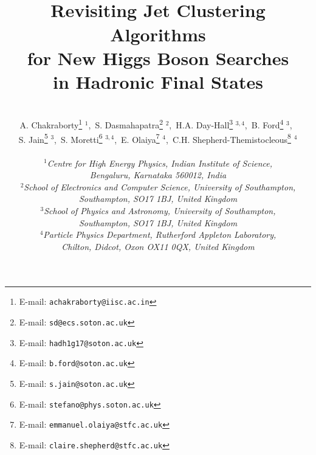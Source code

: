 \documentclass[12pt]{article}
\begin{document}
%


\title{\hfill ~\\[-50mm]
                  \textbf{Revisiting Jet Clustering Algorithms \\
for New Higgs Boson
Searches\\ in Hadronic Final States
                }        }
\date{}

\author{\\[-5mm]
A. Chakraborty\footnote{E-mail: {\tt achakraborty@iisc.ac.in}} $^{1}$,\
S. Dasmahapatra\footnote{E-mail: {\tt sd@ecs.soton.ac.uk}} $^{2}$,\
H.A. Day-Hall\footnote{E-mail: {\tt hadh1g17@soton.ac.uk}} $^{3,4}$,\
B. Ford\footnote{E-mail: {\tt b.ford@soton.ac.uk}} $^{3}$,\ \\
S. Jain\footnote{E-mail: {\tt s.jain@soton.ac.uk}} $^{3}$,\
S. Moretti\footnote{E-mail: {\tt stefano@phys.soton.ac.uk}} $^{3,4}$,\
E. Olaiya\footnote{E-mail: {\tt emmanuel.olaiya@stfc.ac.uk}} $^{4}$,\
C.H. Shepherd-Themistocleous\footnote{E-mail: {\tt claire.shepherd@stfc.ac.uk}} $^{4}$
\\ \\
\emph{\small $^1$Centre for High Energy Physics, Indian Institute of Science,}\\
\emph{\small Bengaluru, Karnataka 560012, India}\\
\emph{\small $^2$School of Electronics and Computer Science, University of Southampton,}\\
\emph{\small Southampton, SO17 1BJ, United Kingdom}\\
\emph{\small $^3$School of Physics and Astronomy, University of Southampton,}\\
\emph{\small Southampton, SO17 1BJ, United Kingdom}\\
\emph{\small  $^4$Particle Physics Department, Rutherford Appleton Laboratory,}\\
\emph{\small Chilton, Didcot, Oxon OX11 0QX, United Kingdom}\\[4mm]
  }

\maketitle

\vspace*{-10mm}
\end{document}
